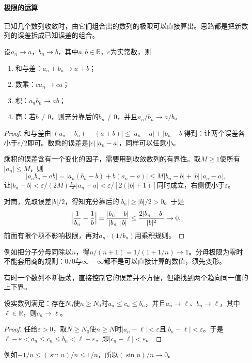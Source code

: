 \paragraph{极限的运算}
已知几个数列收敛时，由它们组合出的数列的极限可以直接算出。思路都是把新数列的误差拆成已知误差的组合。
\begin{theorem}[数列极限的四则运算]
\label{thm:ru-sequence-limit-laws}
设$a_n\to a$，$b_n\to b$，其中$a,b\in\mathbb R$，$c$为实常数，则
\begin{enumerate}
 \item 和与差：$a_n\pm b_n\to a\pm b$；
 \item 数乘：$ca_n\to ca$；
 \item 积：$a_nb_n\to ab$；
 \item 商：若$b\neq0$，则充分靠后的$b_n\neq0$，并且$a_n/b_n\to a/b$。
\end{enumerate}
\end{theorem}
\begin{proof}
和与差由$|(a_n\pm b_n)-(a\pm b)|\leq|a_n-a|+|b_n-b|$得到：让两个误差各小于$\varepsilon/2$即可。数乘的误差是$|c|\,|a_n-a|$，同样可以任意小。

乘积的误差含有一个变化的因子，需要用到收敛数列的有界性。取$M\geq1$使所有$|a_n|\leq M$，则
\[
 |a_nb_n-ab|=|a_n(b_n-b)+b(a_n-a)|\leq M|b_n-b|+|b|\,|a_n-a|,
\]
让$|b_n-b|<\varepsilon/(2M)$与$|a_n-a|<\varepsilon/[2(|b|+1)]$同时成立，右侧便小于$\varepsilon$。

对商，先取误差$|b|/2$，得知充分靠后的$|b_n|\geq|b|/2>0$。于是
\[
 \Bigl|\frac1{b_n}-\frac1b\Bigr|=\frac{|b_n-b|}{|b_n|\,|b|}\leq\frac{2|b_n-b|}{|b|^2}\to0,
\]
前面有限个项不影响极限，再对$a_n\cdot(1/b_n)$用乘积规则。
\end{proof}
例如把分子分母同除以$n$，得$n/(n+1)=1/(1+1/n)\to1$。分母极限为零时不能套用商的规则：$0/0$与$\infty-\infty$都不是可以直接计算的数值，须先变形。

有时一个数列不断振荡，直接控制它的误差并不方便，但能找到两个趋向同一值的上下界。
\begin{theorem}[夹逼定理]
\label{thm:analysis-sequence-squeeze}
设实数列满足：存在$N_0$使$n\geq N_0$时$a_n\leq c_n\leq b_n$，并且$a_n\to\ell$、$b_n\to\ell$，其中$\ell\in\mathbb R$，则$c_n\to\ell$。
\end{theorem}
\begin{proof}
任给$\varepsilon>0$，取$N\geq N_0$使$n\geq N$时$|a_n-\ell|<\varepsilon$且$|b_n-\ell|<\varepsilon$。于是$\ell-\varepsilon<a_n\leq c_n\leq b_n<\ell+\varepsilon$，即$|c_n-\ell|<\varepsilon$。
\end{proof}
例如$-1/n\leq(\sin n)/n\leq1/n$，所以$(\sin n)/n\to0$。

